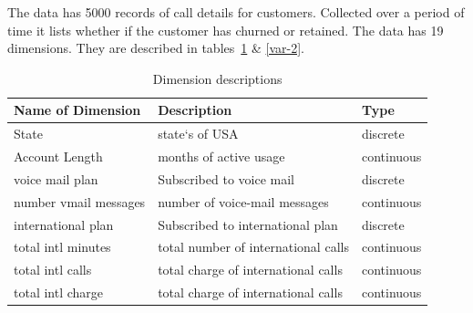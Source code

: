 The data has 5000 records of call details for customers. Collected over a period of time it lists whether if the customer has churned or retained.
The data has 19 dimensions. They are described in tables~\ref{var-1} \& \ref{var-2}.
\begin{table}[h]
	\centering
	\caption{Dimension descriptions}
	\label{var-1}
	\begin{tabular}{lll}
		\hline
		Name of Dimension & Description            & Type                \\
		\hline
		State            & state`s of USA           & discrete            \\
		Account Length   & months of active usage & continuous  \\
		voice mail plan & Subscribed to voice mail & discrete   \\
		number vmail messages & number of voice-mail messages &  continuous   \\
		international plan & Subscribed to international plan &  discrete   \\
		total intl minutes &  total number of international calls  &  continuous   \\
		total intl calls & total charge of international calls &  continuous   \\
		total intl charge & total charge of international calls                       &  continuous   \\
		\hline
	\end{tabular}
\end{table}
